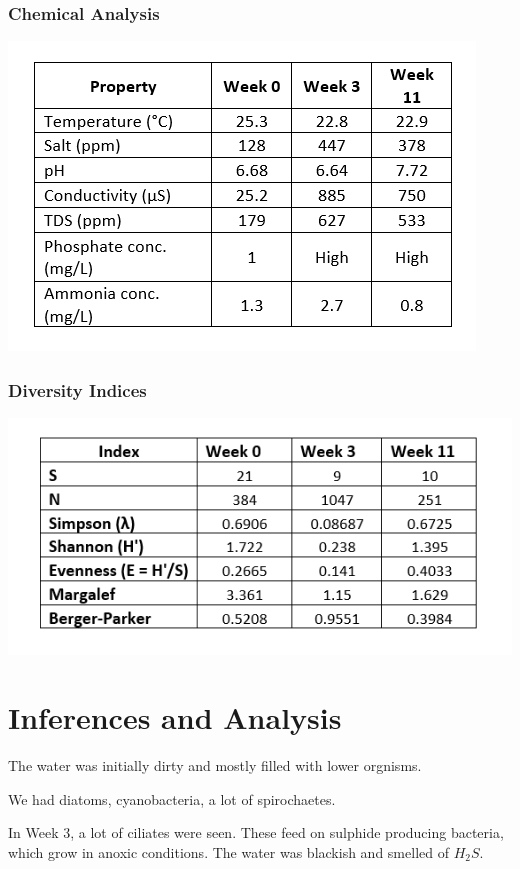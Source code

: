 \documentclass[twocolumn]{article}
\begin{document}
\subsubsection{Chemical Analysis}

\includegraphics[width = \linewidth]{Pond Ecosystem Chemical Analysis.png}

\subsubsection{Diversity Indices}

\includegraphics[width = \linewidth]{Diversity Indices.png}

\section{Inferences and Analysis}

The water was initially dirty and mostly filled with lower orgnisms.

We had diatoms, cyanobacteria, a lot of spirochaetes. 

In Week 3, a lot of ciliates were seen. These feed on sulphide producing bacteria, which grow in anoxic conditions. The water was blackish and smelled of $H_2S$.
\end{document}
